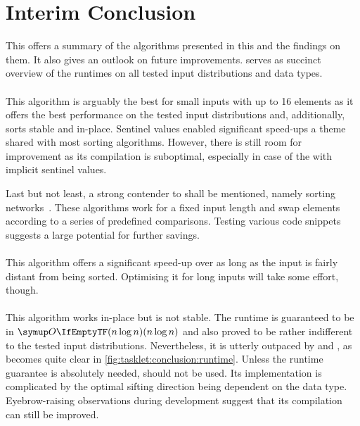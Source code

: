 \section{Interim Conclusion}
\label{sec:tasklet:conclusion}


This  offers a summary of the algorithms presented in this  and the findings on them.
It also gives an outlook on future improvements.
 serves as succinct overview of the runtimes on all tested input distributions and data types.


\paragraph{\IS{}}
This algorithm is arguably the best for small inputs with up to 16 elements as it offers the best performance on the tested input distributions and, additionally, sorts stable and in-place.
Sentinel values enabled significant speed-ups \Dash a theme shared with most sorting algorithms.
However, there is still room for improvement as its compilation is suboptimal, especially in case of the \IS{} with implicit sentinel values.

Last but not least, a strong contender to \IS{} shall be mentioned, namely sorting networks~\cite{codish2017sortingnetworks}.
These algorithms work for a fixed input length and swap elements according to a series of predefined comparisons.
Testing various code snippets~\cites[9]{codish2017sortingnetworks}{m2015fastestway}{paulr2010fastestsort} suggests a large potential for further savings.


\paragraph{\ShS{}}
This  algorithm offers a significant speed-up over \IS{} as long as the input is fairly distant from being sorted.
Optimising it for long inputs will take some effort, though.


\paragraph{\HS{}}
This algorithm works in-place but is not stable.
The runtime is guaranteed to be in \(\bigoh{n \log n}\) and also proved to be rather indifferent to the tested input distributions.
Nevertheless, it is utterly outpaced by \QS{} and \MS{}, as becomes quite clear in \cref{fig:tasklet:conclusion:runtime}.
Unless the runtime guarantee is absolutely needed, \HS{} should not be used.
Its implementation is complicated by the optimal sifting direction being dependent on the data type.
Eyebrow-raising observations during development suggest that its compilation can still be improved.

